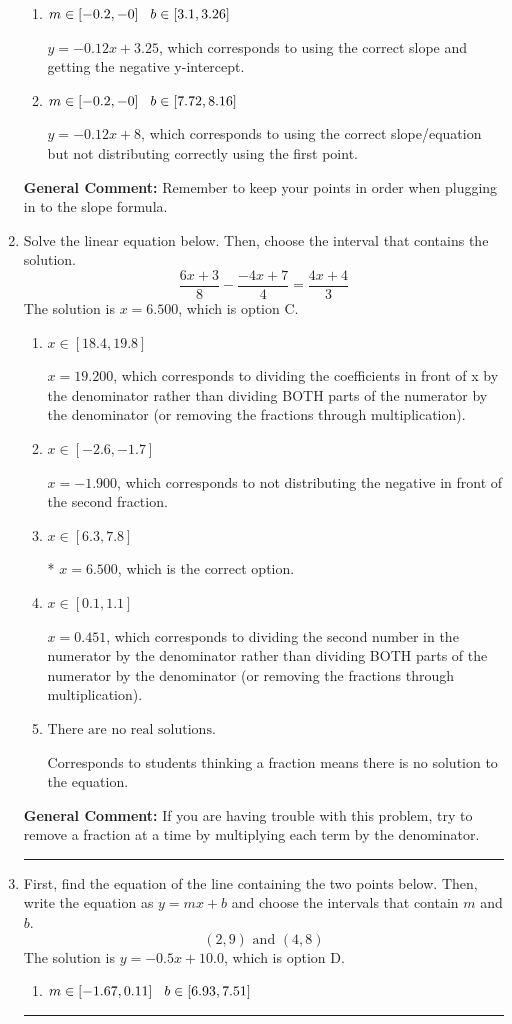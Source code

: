 \documentclass{extbook}[14pt]
\newcommand{\litem}[1]{\item #1

\rule{\textwidth}{0.4pt}}
\begin{document}
\begin{enumerate}
{\begin{enumerate}[label=\Alph*.]
 $y = -0.12x -1$, which corresponds to using the correct slope/equation but not distributing correctly using the second point.
\item \( m \in [-0.2, -0] \hspace*{3mm} b \in [3.1, 3.26] \)

 $y = -0.12x + 3.25$, which corresponds to using the correct slope and getting the negative y-intercept.
\item \( m \in [-0.2, -0] \hspace*{3mm} b \in [7.72, 8.16] \)

 $y = -0.12x + 8$, which corresponds to using the correct slope/equation but not distributing correctly using the first point.
\end{enumerate}

\textbf{General Comment:} Remember to keep your points in order when plugging in to the slope formula.
}
\litem{
Solve the linear equation below. Then, choose the interval that contains the solution.
\[ \frac{6x + 3}{8} - \frac{-4x + 7}{4} = \frac{4x + 4}{3} \]The solution is \( x = 6.500 \), which is option C.\begin{enumerate}[label=\Alph*.]
\item \( x \in [18.4, 19.8] \)

 $x = 19.200$, which corresponds to dividing the coefficients in front of x by the denominator rather than dividing BOTH parts of the numerator by the denominator (or removing the fractions through multiplication).
\item \( x \in [-2.6, -1.7] \)

 $x = -1.900$, which corresponds to not distributing the negative in front of the second fraction.
\item \( x \in [6.3, 7.8] \)

* $x = 6.500$, which is the correct option.
\item \( x \in [0.1, 1.1] \)

 $x = 0.451$, which corresponds to dividing the second number in the numerator by the denominator rather than dividing BOTH parts of the numerator by the denominator (or removing the fractions through multiplication).
\item \( \text{There are no real solutions.} \)

Corresponds to students thinking a fraction means there is no solution to the equation.
\end{enumerate}

\textbf{General Comment:} If you are having trouble with this problem, try to remove a fraction at a time by multiplying each term by the denominator.
}
\litem{
First, find the equation of the line containing the two points below. Then, write the equation as $ y=mx+b $ and choose the intervals that contain $m$ and $b$.
\[ (2, 9) \text{ and } (4, 8) \]The solution is \( y = -0.5x + 10.0 \), which is option D.\begin{enumerate}[label=\Alph*.]
\item \( m \in [-1.67, 0.11] \hspace*{3mm} b \in [6.93, 7.51] \)


\end{enumerate}}
\end{enumerate}
\end{document}
